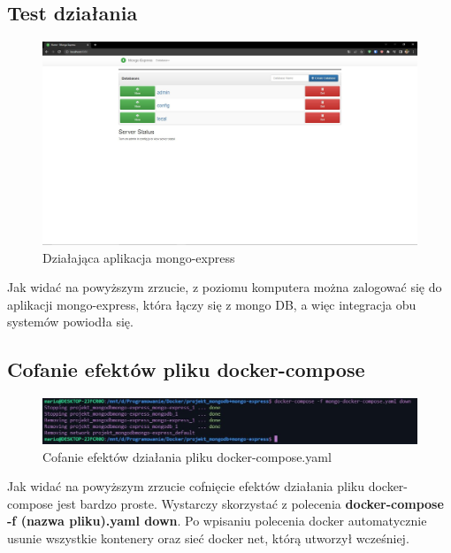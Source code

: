 \documentclass[12pt, a4paper]{article}
\begin{document}
    \subsection{Test działania}
    \begin{figure}[!h]
        \centering
        \includegraphics[width=\textwidth]{mongo-express.JPG}
        \caption{Działająca aplikacja mongo-express}
        \label{fig:mongo_express}
    \end{figure}
    Jak widać na powyższym zrzucie, z poziomu komputera można zalogować się do aplikacji mongo-express, która łączy się z mongo DB, a więc integracja obu systemów powiodła się. 
    \subsection{Cofanie efektów pliku docker-compose}
    \begin{figure}[!h]
        \centering
        \includegraphics[width=\textwidth]{docker-compose-f-down.JPG}
        \caption{Cofanie efektów działania pliku docker-compose.yaml}
        \label{fig:docker_compose_down}
    \end{figure}
    Jak widać na powyższym zrzucie cofnięcie efektów działania pliku docker-compose jest bardzo proste. Wystarczy skorzystać z polecenia \textbf{docker-compose -f (nazwa pliku).yaml down}. Po wpisaniu polecenia docker automatycznie usunie wszystkie kontenery oraz sieć docker net, którą utworzył wcześniej.
\end{document}
